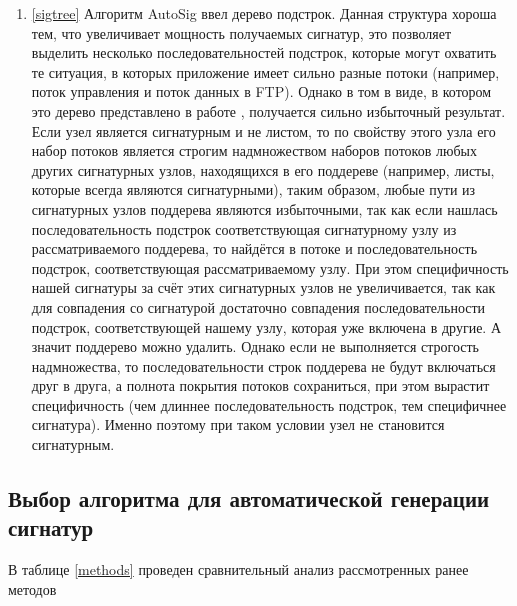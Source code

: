 \begin{enumerate}
    \item \ref{sigtree}
    Алгоритм AutoSig ввел дерево подстрок.
    Данная структура хороша тем, что увеличивает мощность получаемых сигнатур,
    это позволяет выделить несколько последовательностей подстрок, которые могут охватить те ситуация, в которых
    приложение имеет сильно разные потоки (например, поток управления и поток данных в FTP).
    Однако в том в виде, в котором это дерево представлено в работе \cite{ye2009autosig}, получается сильно избыточный результат.
    Если узел является сигнатурным и не листом, то по свойству этого узла его набор потоков является строгим надмножеством
    наборов потоков любых других сигнатурных узлов, находящихся в его поддереве (например, листы, которые всегда являются сигнатурными),
    таким образом, любые пути из сигнатурных узлов поддерева являются избыточными, так как если нашлась последовательность подстрок
    соответствующая сигнатурному узлу из рассматриваемого поддерева,
    то найдётся в потоке и последовательность подстрок, соответствующая рассматриваемому узлу.
    При этом специфичность нашей сигнатуры за счёт этих сигнатурных узлов не увеличивается,
    так как для совпадения со сигнатурой достаточно совпадения последовательности подстрок,
    соответствующей нашему узлу, которая уже включена в другие.
    А значит поддерево можно удалить. Однако если не выполняется строгость надмножества, то последовательности строк
    поддерева не будут включаться друг в друга, а полнота покрытия потоков сохраниться,
    при этом вырастит специфичность (чем длиннее последовательность подстрок, тем специфичнее сигнатура).
    Именно поэтому при таком условии узел не становится сигнатурным.
\end{enumerate}

\subsection{Выбор алгоритма для автоматической генерации сигнатур}

В таблице \ref{methods} проведен сравнительный анализ рассмотренных ранее методов

